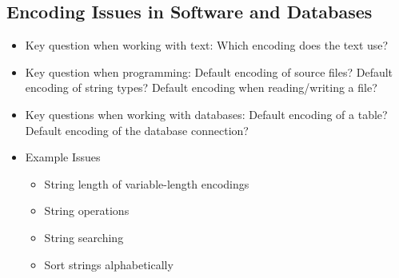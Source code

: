         \subsection{Encoding Issues in Software and Databases} %
            \begin{itemize}
            	\item Key question when working with text: Which encoding does the text use?
            	\item Key question when programming: Default encoding of source files? Default encoding of string types? Default encoding when reading/writing a file?
            	\item Key questions when working with databases: Default encoding of a table? Default encoding of the database connection?
            	\item Example Issues
            		\begin{itemize}
            			\item String length of variable-length encodings
            			\item String operations
            			\item String searching
            			\item Sort strings alphabetically
            		\end{itemize}
            \end{itemize}

